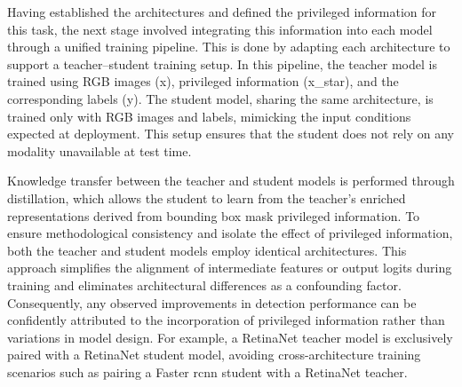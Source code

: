 
Having established the architectures and defined the privileged information for this task, the next stage involved integrating this information into each model through a unified training pipeline. This is done by adapting each architecture to support a teacher–student training setup.
In this pipeline, the teacher model is trained using RGB images (\gls{x}), privileged information (\gls{x_star}), and the corresponding labels (\gls{y}). The student model, sharing the same architecture, is trained only with RGB images and labels, mimicking the input conditions expected at deployment. This setup ensures that the student does not rely on any modality unavailable at test time.

Knowledge transfer between the teacher and student models is performed through distillation, which allows the student to learn from the teacher’s enriched representations derived from bounding box mask privileged information. To ensure methodological consistency and isolate the effect of privileged information, both the teacher and student models employ identical architectures. This approach simplifies the alignment of intermediate features or output logits during training and eliminates architectural differences as a confounding factor. Consequently, any observed improvements in detection performance can be confidently attributed to the incorporation of privileged information rather than variations in model design. For example, a RetinaNet teacher model is exclusively paired with a RetinaNet student model, avoiding cross-architecture training scenarios such as pairing a Faster \gls{rcnn} student with a RetinaNet teacher.


